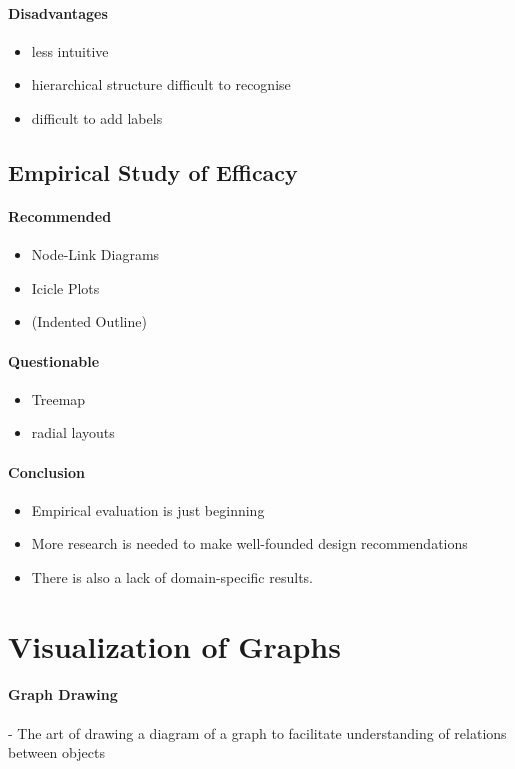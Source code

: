 \documentclass[10pt,a4paper]{article}
\begin{document}
	\paragraph{Disadvantages}
	\begin{itemize}
		\item less intuitive
		\item hierarchical structure difficult to recognise
		\item difficult to add labels
	\end{itemize}

	\subsection{Empirical Study of Efficacy}
		\paragraph{Recommended}
		\begin{itemize}
			\item Node-Link Diagrams
			\item Icicle Plots
			\item (Indented Outline)
		\end{itemize}
		\paragraph{Questionable}
		\begin{itemize}
			\item Treemap
			\item radial layouts
		\end{itemize}
		\paragraph{Conclusion}
		\begin{itemize}
			\item Empirical evaluation is just beginning
			\item More research is needed to make well-founded design recommendations
			\item There is also a lack of domain-specific results.
		\end{itemize}
	
\section{Visualization of Graphs}
	\paragraph{Graph Drawing} - The art of drawing a diagram of a graph to facilitate understanding of relations between objects
\end{document}
